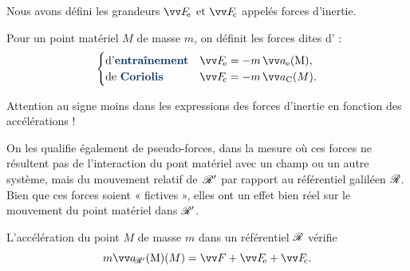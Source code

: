 \documentclass[12pt,fancy]{cours}
\begin{document}
Nous avons défini les grandeurs $\Fe$ et $\Fc$ appelés forces d'inertie.
\begin{definition}\label{def:}
Pour un point matériel $M$ de masse $m$, on définit les forces dites d' :
  $$
  \begin{cases}
    \text{d'\imp{entraînement}} & \Fe=-m\,\ae, \\

    \text{de \imp{Coriolis}} & \Fc=-m\,\aC.
  \end{cases}
  $$
\end{definition}

\begin{danger}
  Attention au signe moins dans les expressions des forces d'inertie en fonction des accélérations !
\end{danger}
On les qualifie également de pseudo-forces, dans la mesure où
ces forces ne résultent pas de l'interaction du pont matériel avec un champ ou un autre système, mais du mouvement relatif de~$\mathcal{R}'$ par rapport au référentiel galiléen $\mathcal{R}$. Bien que ces forces soient « fictives », elles ont un effet bien réel sur le mouvement du point matériel dans $\mathcal{R}'$.

\begin{theorem}\label{form:PFD}
L'accélération du point $M$ de masse $m$ dans un référentiel $\mathcal{R}$  vérifie
\begin{equation*}
m\aRp(M)=\F + \Fe +\Fc.
\end{equation*}
\end{theorem}
\end{document}
